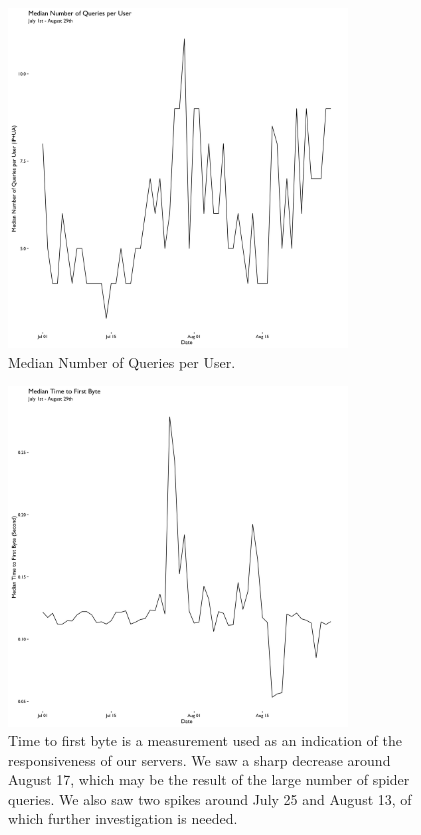 \documentclass[12pt,]{article}
\begin{document}
\begin{figure}[H]
\centering
\includegraphics[width=9cm,height=9cm,keepaspectratio]{figures/md_query_per_user_ts.png}
\caption{Median Number of Queries per User.}
\end{figure}

\begin{figure}[H]
\centering
\includegraphics[width=9cm,height=9cm,keepaspectratio]{figures/median_time_firstbyte_ts.png}
\caption{Time to first byte is a measurement used as an indication of
the responsiveness of our servers. We saw a sharp decrease around August
17, which may be the result of the large number of spider queries. We
also saw two spikes around July 25 and August 13, of which further
investigation is needed.}
\end{figure}

\newpage
\end{document}
